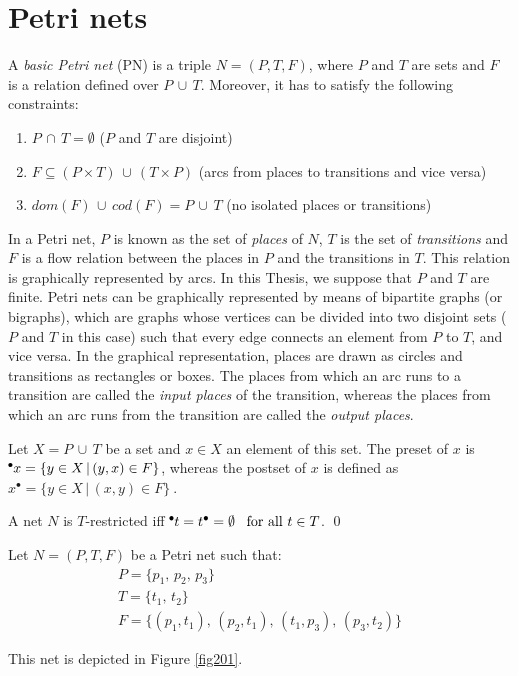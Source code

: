 \section*{Petri nets}

\begin{definition} 
A \emph{basic Petri net} (PN) is a triple $N=(P,T,F)$, where $P$ and $T$
are sets and $F$ is a relation defined over $P \,\cup\,T$. Moreover, it has to satisfy
the following constraints:
\begin{enumerate}
\item $P \,\cap \,T = \emptyset$ ($P$ and $T$ are disjoint)
\item $F \subseteq (P \times T) \,\cup\, (T \times P)$ (arcs from places to transitions and vice versa)
\item $dom(F) \, \cup \, cod(F) = P \, \cup \, T$ (no isolated places or transitions)
\end{enumerate}

In a Petri net, $P$ is known as the set of \emph{places} of $N$, $T$ 
is the set of {\it transitions} and $F$ is a flow relation between the places in $P$
and the transitions in $T$. This relation is graphically represented by arcs.
In this Thesis, we suppose that $P$ and $T$ are finite. Petri nets
can be graphically represented by means of bipartite graphs (or bigraphs), which
are graphs whose vertices can be divided into two disjoint sets ($P$ and $T$ in this case) such that 
every edge connects an element from $P$ to $T$, and vice versa. In the graphical representation, places are drawn
as circles and transitions as rectangles or boxes.  The places 
from which an arc runs to a transition are called the \emph{input places} of the transition, whereas
the places from which an arc runs from the transition are called the \emph{output places}.

Let $X = P\,\cup\,T$ be a set and $x \in X$
an element of this set. The preset of $x$ is
$\hspace*{-0.4em}~^{\bullet} \hspace*{-0.05em}x = \{ y \in X \,|\, (y,x) \in F\}$, whereas the postset of $x$ 
is defined as $x^{\bullet} = \{ y \in X \,|\, (x,y) \in F\}~$.

A net $N$ is $T$-restricted iff $\hspace*{-0.4em}~^{\bullet} \hspace*{-0.05em}t = t^{\bullet} =
\emptyset\,\,\,\ \text{for all } t \in T$.
\qed
\end{definition}

\begin{example} Let $N=(P,T,F)$ be a Petri net such that:
\[\begin{array}{l}
P = \{ p_1,\,p_2,\,p_3\}\\
T = \{ t_1,\,t_2\}\\
F = \{ (p_1,t_1),\,(p_2,t_1),\,(t_1,p_3),\,(p_3,t_2)\}
\end{array}\]

This net is depicted in Figure \ref{fig201}.
\end{example}

